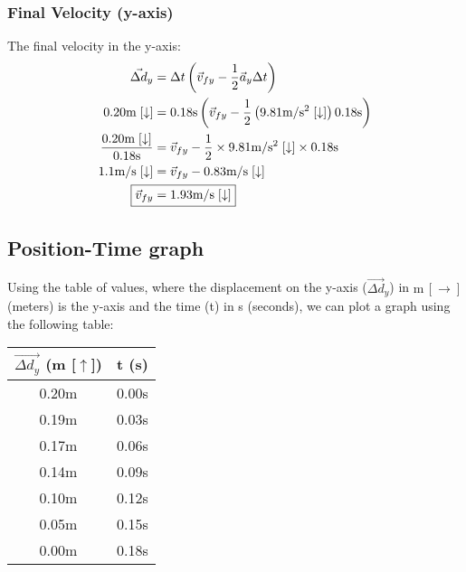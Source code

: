 \documentclass[a4paper,12pt]{article}
\begin{document}
	\subsubsection{Final Velocity (y-axis)}
	The final velocity in the y-axis:
	\begin{align*}
		\vec{\Delta d}_y&=\Delta t\left(\vec{v}_{fy}-\frac{1}{2}\vec{a}_y\Delta t\right)\\
		0.20\text{m}\;[\downarrow]&=0.18\text{s}\left(\vec{v}_{fy}-\frac{1}{2}\left(9.81\text{m}/\text{s}^2\;[\downarrow]\right)0.18\text{s}\right)\\
		\frac{0.20\text{m}\;[\downarrow]}{0.18\text{s}}&=\vec{v}_{fy}-\frac{1}{2}\times9.81\text{m}/\text{s}^2\;[\downarrow]\times0.18\text{s}\\
		1.1\text{m}/\text{s}\;[\downarrow]&=\vec{v}_{fy}-0.83\text{m}/\text{s}\;[\downarrow]\\
		\Aboxed{\vec{v}_{fy}&=1.93\text{m}/\text{s}\;[\downarrow]}
	\end{align*}
	\newpage
	\subsection{Position-Time graph}
	Using the table of values, where the displacement on the y-axis ($\vec{\Delta d}_y$) in $\text{m} \,[\rightarrow]$ (meters) is the y-axis and the time (t) in s (seconds), we can plot a graph using the following table:
	\begin{center}
		\begin{tabular}{ |c|c| } 
			\hline
			$\vec{\Delta d_y}$ (m [$\uparrow$]) & t (s)\\ 
			\hline\hline
			0.20m & 0.00s\\
			\hline 
			0.19m & 0.03s\\ 
			\hline
			0.17m & 0.06s\\
			\hline
			0.14m & 0.09s \\
			\hline
			0.10m & 0.12s\\
			\hline
			0.05m & 0.15s \\
			\hline
			0.00m & 0.18s\\
			\hline
		\end{tabular} 
	\end{center}
	
\end{document}
